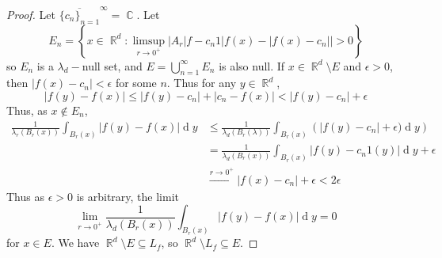 \documentclass[11pt, a4paper]{memoir}
\DeclareMathOperator{\R}{{\mathbb{R}}}
\DeclareMathOperator{\C}{{\mathbb{C}}}
\newcommand{\fto}[1]{\ensuremath{\xrightarrow{\scriptstyle{#1}}}}
\newcommand{\ol}[1]{\ensuremath{\overline{#1}}}
\theoremstyle{change}
\theoremstyle{plain}
\theoremstyle{nonumberplain}
\newtheorem{proof}{Proof}
\renewcommand{\d}[1]{\ensuremath{\operatorname{d}\!{#1}}}
\numberwithin{equation}{section}
\begin{document}
\begin{proof}
    Let $\ol{\{c_n\}_{n=1}}^\infty=\C$.
    Let
    \begin{equation*}
        E_n=\left\{x\in\R^d:\limsup_{r\to 0^+}\left\lvert A_r|f-c_n1|f(x)-|f(x)-c_n|\right\rvert>0\right\}
    \end{equation*}
    so $E_n$ is a $\lambda_d-$null set, and $E=\bigcup_{n=1}^\infty E_n$ is also null.
    If $x\in\R^d\setminus E$ and $\epsilon>0$, then $|f(x)-c_n|<\epsilon$ for some $n$.
    Thus for any $y\in\R^d$,
    \begin{equation*}
        |f(y)-f(x)|\leq|f(y)-c_n|+|c_n-f(x)|<|f(y)-c_n|+\epsilon
    \end{equation*}
    Thus, as $x\notin E_n$,
    \begin{align*}
        \frac{1}{\lambda_r(B_r(x))}\int_{B_r(x)}|f(y)-f(x)|\d{y}&\leq\frac{1}{\lambda_d(B_r(\lambda))}\int_{B_r(x)}\left(|f(y)-c_n|+\epsilon)\d{y}\right)\\
                                                                &=\frac{1}{\lambda_d(B_r(x))}\int_{B_r(x)}|f(y)-c_n1(y)|\d{y}+\epsilon\\
                                                                &\fto{r\to 0^+}|f(x)-c_n|+\epsilon<2\epsilon
    \end{align*}
    Thus as $\epsilon>0$ is arbitrary, the limit
    \begin{equation*}
        \lim_{r\to 0^+}\frac{1}{\lambda_d(B_r(x))}\int_{B_r(x)}|f(y)-f(x)|\d{y}=0
    \end{equation*}
    for $x\in E$.
    We have $\R^d\setminus E\subseteq L_f$, so $\R^d\setminus L_f\subseteq E$.
\end{proof}
\end{document}
